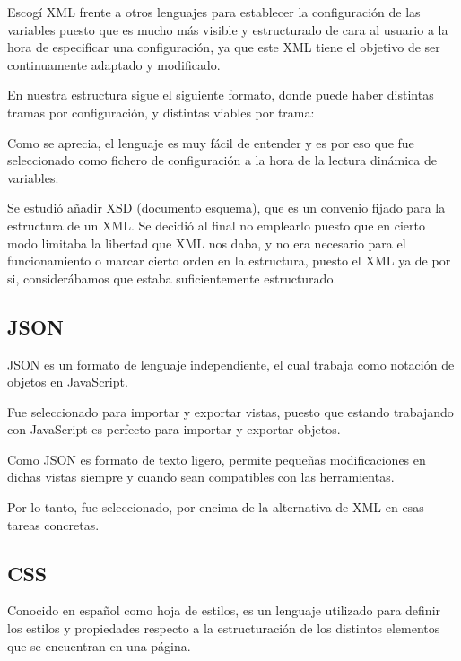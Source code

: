 Escogí XML frente a otros lenguajes para establecer la configuración de las variables puesto que es mucho más visible y estructurado de cara al usuario a la hora de especificar una configuración, ya que este XML tiene el objetivo de ser continuamente adaptado y modificado.


En nuestra estructura sigue el siguiente formato, donde puede haber distintas tramas por configuración, y distintas viables por trama:



Como se aprecia, el lenguaje es muy fácil de entender y es por eso que fue seleccionado como fichero de configuración a la hora de la lectura dinámica de variables.

Se estudió añadir XSD \cite{XSD}(documento esquema), que es un convenio fijado para la estructura de un XML. Se decidió al final no emplearlo puesto que en cierto modo limitaba la libertad que XML nos daba, y no era necesario para el funcionamiento o marcar cierto orden en la estructura, puesto el XML ya de por si, considerábamos que estaba suficientemente estructurado.

\subsection{JSON}
JSON es un formato de lenguaje independiente, el cual trabaja como notación de objetos en JavaScript.

Fue seleccionado para importar y exportar vistas, puesto que estando trabajando con JavaScript es perfecto para importar y exportar objetos.

Como JSON es formato de texto ligero, permite pequeñas modificaciones en dichas vistas siempre y cuando sean compatibles con las herramientas. \cite{JSON}

Por lo tanto, fue seleccionado, por encima de la alternativa de XML en esas tareas concretas.

\subsection{CSS}
Conocido en español como hoja de estilos, es un lenguaje utilizado para definir los estilos y propiedades respecto a la estructuración de los distintos elementos que se encuentran en una página. \cite{CSS}


